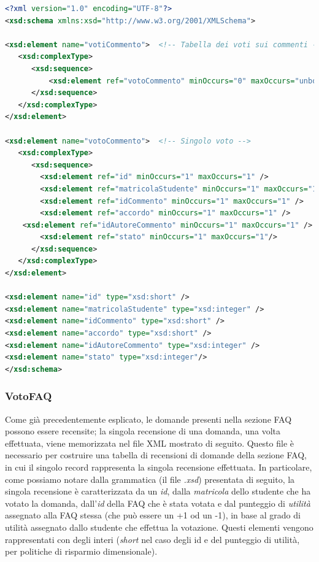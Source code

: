 \documentclass [a4paper,11pt]{book}
\begin{document}
\begin{lstlisting}[language=XML]
<?xml version="1.0" encoding="UTF-8"?>
<xsd:schema xmlns:xsd="http://www.w3.org/2001/XMLSchema">

<xsd:element name="votiCommento">  <!-- Tabella dei voti sui commenti -->
   <xsd:complexType> 
      <xsd:sequence>
	      <xsd:element ref="votoCommento" minOccurs="0" maxOccurs="unbounded" />
      </xsd:sequence>
   </xsd:complexType>
</xsd:element>

<xsd:element name="votoCommento">  <!-- Singolo voto -->
   <xsd:complexType> 
      <xsd:sequence>
        <xsd:element ref="id" minOccurs="1" maxOccurs="1" /> 
        <xsd:element ref="matricolaStudente" minOccurs="1" maxOccurs="1" />
        <xsd:element ref="idCommento" minOccurs="1" maxOccurs="1" /> 
        <xsd:element ref="accordo" minOccurs="1" maxOccurs="1" /> 
	<xsd:element ref="idAutoreCommento" minOccurs="1" maxOccurs="1" /> 
        <xsd:element ref="stato" minOccurs="1" maxOccurs="1"/>
      </xsd:sequence>
   </xsd:complexType>
</xsd:element>

<xsd:element name="id" type="xsd:short" />
<xsd:element name="matricolaStudente" type="xsd:integer" />
<xsd:element name="idCommento" type="xsd:short" />
<xsd:element name="accordo" type="xsd:short" />
<xsd:element name="idAutoreCommento" type="xsd:integer" /> 
<xsd:element name="stato" type="xsd:integer"/>
</xsd:schema>
\end{lstlisting}

\medskip

\subsubsection{VotoFAQ}

Come già precedentemente esplicato, le domande presenti nella sezione FAQ possono essere recensite; la singola recensione di una domanda, una volta effettuata, viene memorizzata nel file XML mostrato di seguito. Questo file è necessario per costruire una tabella di recensioni di domande della sezione FAQ, in cui il singolo record rappresenta la singola recensione effettuata. In particolare, come possiamo notare dalla grammatica (il file \emph{.xsd}) presentata di seguito, la singola recensione è caratterizzata da un \emph{id}, dalla \emph{matricola} dello studente che ha votato la domanda, dall'\emph{id} della FAQ che è stata votata e dal punteggio di \emph{utilità} assegnato alla FAQ stessa (che può essere un +1 od un -1), in base al grado di utilità assegnato dallo studente che effettua la votazione. Questi elementi vengono rappresentati con degli interi (\emph{short} nel caso degli id e del punteggio di utilità, per politiche di risparmio dimensionale).
\end{document}
